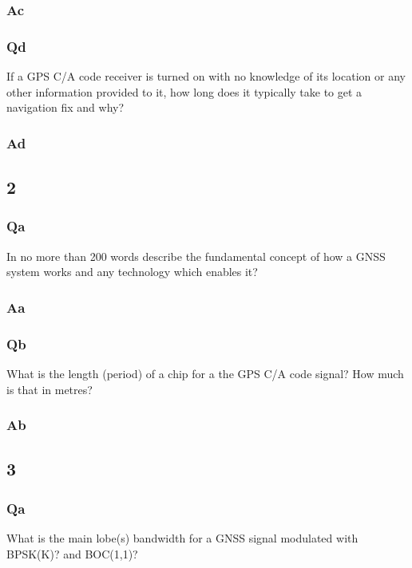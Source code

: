 \documentclass[11pt]{article}
\begin{document}
\subsubsection{Ac}



\subsubsection{Qd}
If a GPS C/A code receiver is turned on with no knowledge of its location or any other information provided to it, how long does it typically take to get a navigation fix and why?
\subsubsection{Ad}



\subsection{2}

\subsubsection{Qa}
In no more than 200 words describe the fundamental concept of how a GNSS system works and any technology which enables it?
\subsubsection{Aa}



\subsubsection{Qb}
What is the length (period) of a chip for a the GPS C/A code signal? How much is that in metres?
\subsubsection{Ab}



\subsection{3}

\subsubsection{Qa}
What is the main lobe(s) bandwidth for a GNSS signal modulated with BPSK(K)? and BOC(1,1)?
\end{document}
